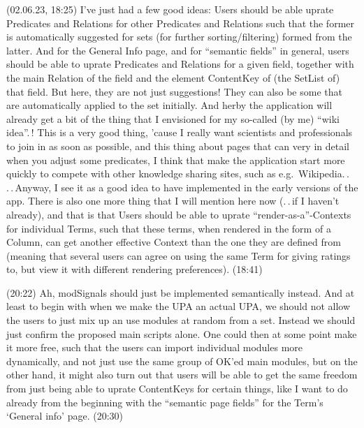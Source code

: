 \documentclass{report}
\begin{document}
(02.06.23, 18:25) I've just had a few good ideas: Users should be able uprate Predicates and Relations for other Predicates and Relations such that the former is automatically suggested for sets (for further sorting/filtering) formed from the latter. And for the General Info page, and for ``semantic fields'' in general, users should be able to uprate Predicates and Relations for a given field, together with the main Relation of the field and the element ContentKey of (the SetList of) that field. But here, they are not just suggestions! They can also be some that are automatically applied to the set initially. And herby the application will already get a bit of the thing that I envisioned for my so-called (by me) ``wiki idea''.\,! This is a very good thing, 'cause I really want scientists and professionals to join in as soon as possible, and this thing about pages that can very in detail when you adjust some predicates, I think that make the application start more quickly to compete with other knowledge sharing sites, such as e.g.\ Wikipedia.\,. .\,.\,Anyway, I see it as a good idea to have implemented in the early versions of the app. There is also one more thing that I will mention here now (.\,.\,if I haven't already), and that is that Users should be able to uprate ``render-as-a''-Contexts for individual Terms, such that these terms, when rendered in the form of a Column, can get another effective Context than the one they are defined from (meaning that several users can agree on using the same Term for giving ratings to, but view it with different rendering preferences). (18:41)

(20:22) Ah, modSignals should just be implemented semantically instead. And at least to begin with when we make the UPA an actual UPA, we should not allow the users to just mix up an use modules at random from a set. Instead we should just confirm the proposed main scripts alone. One could then at some point make it more free, such that the users can import individual modules more dynamically, and not just use the same group of OK'ed main modules, but on the other hand, it might also turn out that users will be able to get the same freedom from just being able to uprate ContentKeys for certain things, like I want to do already from the beginning with the ``semantic page fields'' for the Term's `General info' page. (20:30)
\end{document}
